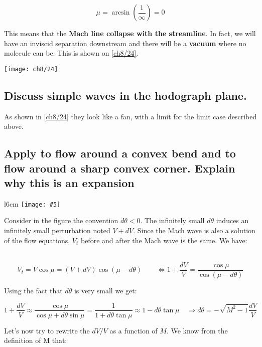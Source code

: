 \documentclass[british,french,11pt, a4paper, openany]{article}
\newcommand{\wrapfig}[6]{%
	\begin{wrapfigure}[#1]{#2}{#3cm}%
		\vspace{-5mm}%
		\texttt{[image: \#5]}%
		\captionof{figure}{}%
		\label{#6}%
	\end{wrapfigure}%
}
\begin{document}
\begin{equation}
\mu = \arcsin \left( \frac{1}{\infty} \right) = 0
\end{equation}

This means that the \textbf{Mach line collapse with the streamline}. In fact, we will have an inviscid separation downstream and there will be a \textbf{vacuum} where no molecule can be. This is shown on \autoref{ch8/24}.

\begin{center}
	\texttt{[image: ch8/24]}
	\label{ch8/24}
\end{center}

\subsection{Discuss simple waves in the hodograph plane.}

As shown in \autoref{ch8/24} they look like a fan, with a limit for the limit case described above.

\subsection{Apply to flow around a convex bend and to flow around a sharp convex corner. Explain why this is an expansion}

\wrapfig{7}{l}{6}{0.15}{ch8/6}{ch8/6}
Consider in the figure the convention $d\theta < 0$. The infinitely small $d\theta$ induces an infinitely small perturbation noted $V+dV$. Since the Mach wave is also a solution of the flow equations, $V_t$ before and after the Mach wave is the same. We have: 

\ \\

\begin{equation}
V_t = V\cos \mu = (V+dV) \cos (\mu - d\theta) \qquad \Leftrightarrow 1+\frac{dV}{V} = \frac{\cos \mu }{\cos (\mu - d\theta)}
\label{eq:8.63}
\end{equation}

Using the fact that $d\theta$ is very small we get: 

\begin{equation}
1+\frac{dV}{V} \approx \frac{\cos \mu }{\cos \mu + d\theta \sin \mu } = \frac{1}{1 + d\theta \tan \mu} \approx 1- d\theta \tan \mu \quad \Rightarrow d\theta = - \sqrt{M^2 - 1} \frac{dV}{V} 
\label{eq:dV/V}
\end{equation}

Let's now try to rewrite the $dV/V$ as a function of $M$. We know from the definition of M that: 
\end{document}
